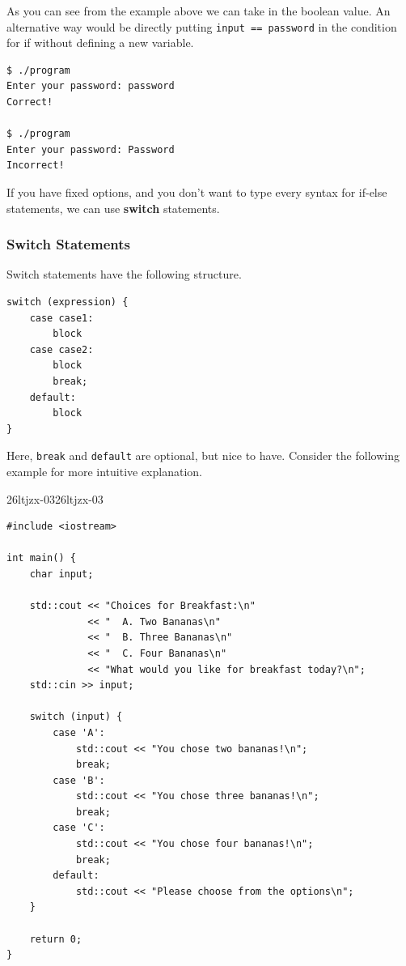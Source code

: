 \documentclass[../../../main.tex]{subfiles}
\begin{document}
As you can see from the example above we can take in the boolean
value. An alternative way would be directly putting
\verb|input == password| in the condition for if without defining
a new variable.

\begin{outputbox}
\begin{lstlisting}[style=basic]
$ ./program
Enter your password: password
Correct!

$ ./program
Enter your password: Password
Incorrect!
\end{lstlisting}
\end{outputbox}

If you have fixed options, and you don't want to type every
syntax for if-else statements, we can use \textbf{switch}
statements.

\subsubsection{Switch Statements}

Switch statements have the following structure.

\begin{basicbox}
\begin{lstlisting}[style=basic]
switch (expression) {
    case case1:
        block
    case case2:
        block
        break;
    default:
        block
}
\end{lstlisting}
\end{basicbox}

Here, \verb|break| and \verb|default| are optional, but nice to
have. Consider the following example for more intuitive explanation.

\begin{cppbox}{26ltjzx-03}{26ltjzx-03}
\begin{lstlisting}[style=cppstyle]
#include <iostream>

int main() {
    char input;

    std::cout << "Choices for Breakfast:\n"
              << "  A. Two Bananas\n"
              << "  B. Three Bananas\n"
              << "  C. Four Bananas\n"
              << "What would you like for breakfast today?\n";
    std::cin >> input;

    switch (input) {
        case 'A':
            std::cout << "You chose two bananas!\n";
            break;
        case 'B':
            std::cout << "You chose three bananas!\n";
            break;
        case 'C':
            std::cout << "You chose four bananas!\n";
            break;
        default:
            std::cout << "Please choose from the options\n";
    }

    return 0;
}
\end{lstlisting}
\end{cppbox}
\end{document}
